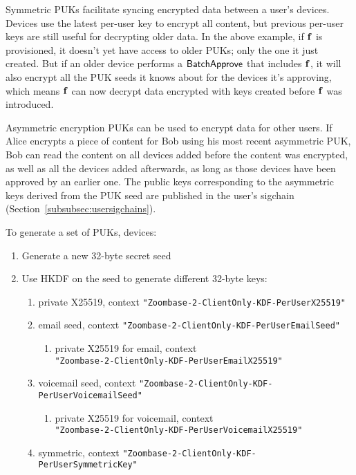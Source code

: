 Symmetric PUKs facilitate syncing encrypted data between a user's devices. Devices use the latest
per-user key to encrypt all content, but previous per-user keys are still useful for decrypting
older data. In the above example, if $\mathbf{f}$ is provisioned, it doesn't yet have access to older
PUKs; only the one it just created. But if an older device performs a $\mathsf{BatchApprove}{}$ that
includes $\mathbf{f}$, it will also encrypt all the PUK seeds it knows about for the devices it's
approving, which means $\mathbf{f}$ can now decrypt data encrypted with keys created before $\mathbf{f}$
was introduced.

Asymmetric encryption PUKs can be used to encrypt data for other users. If Alice encrypts a piece of
content for Bob using his most recent asymmetric PUK, Bob can read the content on all devices added
before the content was encrypted, as well as all the devices added afterwards, as long as those
devices have been approved by an earlier one. The public keys corresponding to the asymmetric keys
derived from the PUK seed are published in the user's sigchain
(Section~\ref{subsubsec:usersigchains}).

To generate a set of PUKs, devices:

\begin{enumerate}
\item
Generate a new 32-byte secret seed
\item
Use HKDF on the seed to generate different 32-byte keys:
\begin{enumerate}
\item
private X25519, context \texttt{"Zoombase-2-ClientOnly-KDF-PerUserX25519"}
\item
email seed, context \texttt{"Zoombase-2-ClientOnly-KDF-PerUserEmailSeed"}
\begin{enumerate}
\item
  private X25519 for email, context \\ \texttt{"Zoombase-2-ClientOnly-KDF-PerUserEmailX25519"}
\end{enumerate}
\item
voicemail seed, context \texttt{"Zoombase-2-ClientOnly-KDF-PerUserVoicemailSeed"}
\begin{enumerate}
\item
  private X25519 for voicemail, context  \\
  \texttt{"Zoombase-2-ClientOnly-KDF-PerUserVoicemailX25519"}
\end{enumerate}
\item
symmetric, context \texttt{"Zoombase-2-ClientOnly-KDF-PerUserSymmetricKey"}
\end{enumerate}
\end{enumerate}


